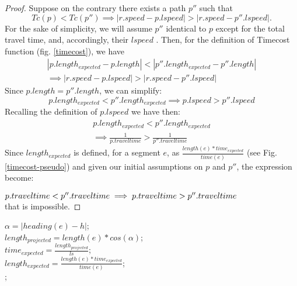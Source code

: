 \documentclass[5p]{elsarticle}
\begin{document}
\begin{proof}
Suppose on the contrary there exists a path $p''$ such that
\begin{displaymath}
Tc(p)<Tc(p'') \implies |r.speed-p.lspeed| > |r.speed-p''.lspeed|.
\end{displaymath}
For the sake of simplicity, we will assume $p''$ identical to $p$ except for the total travel time, and, accordingly, their $lspeed$ . Then, for the definition of Timecost function (fig. \ref{timecost}),
we have
\begin{gather*}
|p.length_{expected} -p.length | < |p''.length_{expected}-p''.length | 
\\ \implies |r.speed-p.lspeed| > |r.speed-p''.lspeed|
\end{gather*}
Since $p.length=p''.length$,  we can simplify:
\begin{displaymath}
p.length_{expected}  < p''.length_{expected} \implies p.lspeed > p''.lspeed
\end{displaymath}
Recalling the definition of $p.lspeed$  we have then:
\begin{gather*}
p.length_{expected}  < p''.length_{expected}
\\ \implies \frac{1}{p.traveltime} > \frac{1}{p''.traveltime}
\end{gather*}
\newline
Since $length_{expected}$ is defined, for a segment $e$, as 
\newline
\begin{math}
\frac{length(e) * time_{expected}}{time(e)}
\end{math} 
(see Fig. \ref{timecost-pseudo}) and given our initial assumptions on $p$ and $p''$, the expression become:

\begin{math}
\centering
p.traveltime < p''.traveltime 
 \implies p.traveltime > p''.traveltime
\end{math}\\
that is impossible.

\end{proof}


 \begin{algorithm2e} [h]
\scriptsize{
\BlankLine
$\alpha= | heading(e)-h |$;\\
$length_{projected}=length(e)* cos(\alpha)$;\\
$time_{expected}=\frac{length_{projected}}{ls}$;\\
$length_{expected}=\frac{length(e) * time_{expected} }{time(e)}$;\\
; 
        


\caption{$Pseudocode for Timecost computing$}
\label{timecost-pseudo}}
\end{algorithm2e}
\end{document}
